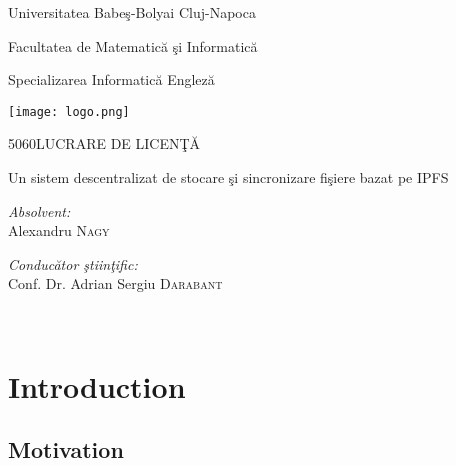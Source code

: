 \documentclass[12pt]{report}
\makeatletter
\newcommand\HUGE{\@setfontsize\Huge{50}{60}}
\makeatother
\begin{document}
\begin{titlepage}

\centering 	

{\scshape{\Large Universitatea Babeş-Bolyai Cluj-Napoca\par}}
{\scshape{\large Facultatea de Matematică şi Informatică\par}}
{\scshape{\large Specializarea Informatică Engleză\par}}

\vspace{1.5cm}

\texttt{[image: logo.png]}\par

\centering 	
    
{\scshape{\HUGE LUCRARE DE LICENŢĂ\par}}
\vspace{1cm}
	
{\scshape{\Large  Un sistem descentralizat de stocare şi sincronizare fişiere bazat pe IPFS\par}}
\vspace{2cm}
\large
\emph{Absolvent:}\\
Alexandru \textsc{Nagy} \\ 

\vspace{5mm}

\large
\emph{Conducător ştiinţific:} \\
Conf. Dr. Adrian Sergiu \textsc{Darabant} 

\vspace{2cm}

{\large \the\year}\\[2cm] 
    
\end{titlepage}



\tableofcontents 

%

\chapter{Introduction}

\section{Motivation}
\end{document}
